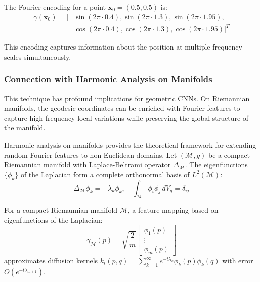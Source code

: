 The Fourier encoding for a point $\mathbf{x}_0 = (0.5, 0.5)$ is:
\begin{align}
\gamma(\mathbf{x}_0) = [&\sin(2\pi \cdot 0.4), \sin(2\pi \cdot 1.3), \sin(2\pi \cdot 1.95), \\
&\cos(2\pi \cdot 0.4), \cos(2\pi \cdot 1.3), \cos(2\pi \cdot 1.95)]^T
\end{align}

This encoding captures information about the position at multiple frequency scales simultaneously.

\subsubsection{Connection with Harmonic Analysis on Manifolds}

This technique has profound implications for geometric CNNs. On Riemannian manifolds, the geodesic coordinates can be enriched with Fourier features to capture high-frequency local variations while preserving the global structure of the manifold.

Harmonic analysis on manifolds provides the theoretical framework for extending random Fourier features to non-Euclidean domains. Let $(\mathcal{M}, g)$ be a compact Riemannian manifold with Laplace-Beltrami operator $\Delta_{\mathcal{M}}$. The eigenfunctions $\{\phi_k\}$ of the Laplacian form a complete orthonormal basis of $L^2(\mathcal{M})$:
\begin{equation}
\Delta_{\mathcal{M}} \phi_k = -\lambda_k \phi_k, \quad \int_{\mathcal{M}} \phi_i \phi_j \, dV_g = \delta_{ij}
\end{equation}

\begin{proposition}
For a compact Riemannian manifold $\mathcal{M}$, a feature mapping based on eigenfunctions of the Laplacian:
\begin{equation}
\gamma_{\mathcal{M}}(p) = \sqrt{\frac{2}{m}} \begin{bmatrix} \phi_1(p) \\ \vdots \\ \phi_m(p) \end{bmatrix}
\end{equation}
approximates diffusion kernels $k_t(p, q) = \sum_{k=1}^\infty e^{-t\lambda_k} \phi_k(p)\phi_k(q)$ with error $O(e^{-t\lambda_{m+1}})$.
\end{proposition}

